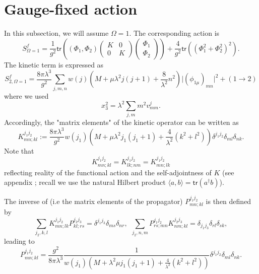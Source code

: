\documentclass[10pt]{book}
\newcommand{\tr}{\mathsf{tr}}
\theoremstyle{break}
\begin{document}
\section{Gauge-fixed action}


In this subsection, we will assume $\Omega=1$. The corresponding action is%
%
\begin{equation}
S^f_{\Omega=1} = \frac{1}{g^2} \tr( (\Phi_1,\Phi_2)
\begin{pmatrix}
K&0\\
0&K
\end{pmatrix} 
\begin{pmatrix}
\Phi_1\\
\Phi_2
\end{pmatrix} 
)
+ \frac{4}{g^2} \tr( (\Phi_1^2 + \Phi_2^2)^2).%
\end{equation}
%
The kinetic term is expressed as 
\begin{equation}
S^f_{2, \Omega=1}=\frac{8\pi\lambda^3}{g^2}\sum_{j,m,n}w(j)(M+\mu\lambda^2j(j+1)+\frac{8}{\lambda^2}n^2)\vert(\phi_{1\mu})_{mn}\vert^2+(1\to2)%
\end{equation}
where we used
\begin{equation}
x_3^2 = \lambda^2 \sum_{j,m} m^2 v^j_{mm}.
\end{equation}
Accordingly, the "matrix elements" of the kinetic operator can be written as
\begin{equation}
K^{j_1 j_2}_{mn;kl} := \frac{8\pi\lambda^3}{g^2} w(j_1) ( M + \mu \lambda^2 j_1 (j_1+1) + \frac{4}{\lambda^2} (k^2+l^2) ) \delta^{j_1j_2} \delta_{ml} \delta_{nk}. %
\end{equation}
Note that %
%
\begin{equation}
K^{j_1j_2}_{mn;kl} = K^{j_1j_2}_{lk;nm} = K^{j_1j_2}_{mn;lk} %
\end{equation}
%
reflecting reality of the functional action and the self-adjointness of $K$ (see appendix %
; recall we use the natural Hilbert product $\langle a,b \rangle = \tr(a^\dag b)$).\par

The inverse of %
(i.e the matrix elements of the propagator) $P^{j_1j_2}_{mn;kl}$ is then defined by%
%
\begin{equation}
\sum_{j_2,k,l} K^{j_1j_2}_{mn;lk} P^{j_2j_3}_{kl;rs} = \delta^{j_1j_3} \delta_{ms} \delta_{nr}, \ \ \sum_{j_2,n,m} P^{j_1j_2}_{rs;mn} K^{j_2j_3}_{nm;kl} = \delta_{j_1j_3} \delta_{rl} \delta_{sk}, %
\end{equation}
%
leading to%
%
\begin{equation}
P^{j_1j_2}_{mn;kl} = \frac{g^2}{8\pi\lambda^3} \frac{1}{w(j_1)(M+\lambda^2\mu j_1(j_1+1)+\frac{4}{\lambda^2}(k^2+l^2))}\delta^{j_1j_2}\delta_{ml}\delta_{nk}.  %
\end{equation}
\end{document}
